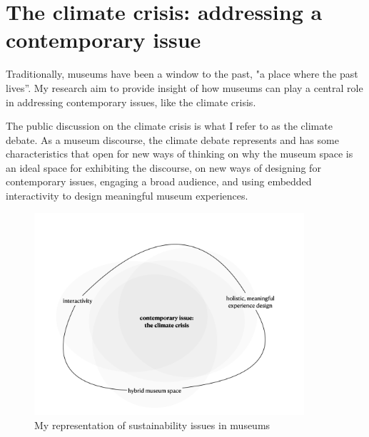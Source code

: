 \section{The climate crisis: addressing a contemporary issue}

Traditionally, museums have been a window to the past, "a place where the past lives”. My research aim to provide insight of how museums can play a central role in addressing contemporary issues, like the climate crisis.

The public discussion on the climate crisis is what I refer to as the climate debate. As a museum discourse, the climate debate represents and has some characteristics that open for new ways of thinking on why the museum space is an ideal space for exhibiting the discourse, on new ways of designing for contemporary issues, engaging a broad audience, and using embedded interactivity to design meaningful museum experiences.

\begin{figure}[h]
\includegraphics[width=10cm]{pictures/problem_sphere.png}
\caption{My representation of sustainability issues in museums}
\centering 
\end{figure}

